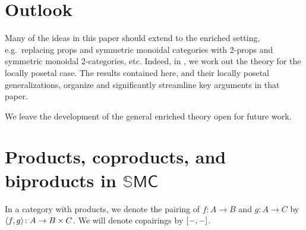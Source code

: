 \documentclass[11pt, oneside, article]{memoir}
\theoremstyle{plain}
\theoremstyle{definition}
\theoremstyle{remark}
\DeclarePairedDelimiter{\pair}{\langle}{\rangle}
\DeclarePairedDelimiter{\copair}{[}{]}
\begin{document}
\chapter{Outlook}

Many of the ideas in this paper should extend to the enriched setting, e.g.\ replacing props and symmetric monoidal categories with 2-props and symmetric monoidal 2-categories, etc. Indeed, in \cite{fong2019abelian}, we work out the theory for the locally posetal case. The results contained here, and their locally posetal generalizations, organize and significantly streamline key arguments in that paper.

We leave the development of the general enriched theory open for future work.

\appendix

\chapter{Products, coproducts, and biproducts in $\mathbb{S}\mathsf{MC}$}\label{chap.proofs}


In a category with products, we denote the pairing of $f\colon A\to B$ and $g\colon A\to C$ by $\pair{f,g}\colon A\to B\times C$. We will denote copairings by $\copair{-,-}$.
\end{document}
